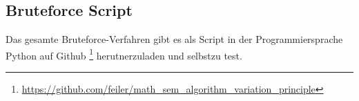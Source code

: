 \subsection{Bruteforce Script
\label{variationsprinzip_algorithmen:section:bruteforce}}
Das gesamte Bruteforce-Verfahren gibt es als Script in der Programmiersprache Python auf 
Github
\footnote{\url{https://github.com/feiler/math_sem_algorithm_variation_principle}}
\cite{algorythm:repo}
herutnerzuladen und selbstzu test.


